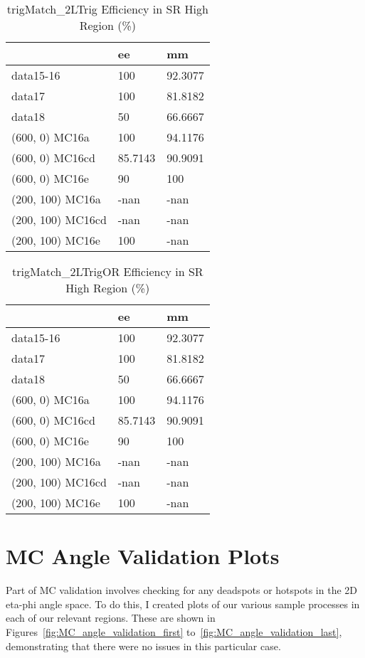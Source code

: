 \begin{table}
\begin{center}
\caption{trigMatch\_2LTrig Efficiency in SR High Region (\%)}
\begin{tabular}{l|l|l}
& ee & mm \\
\hline
data15-16 & 100 & 92.3077 \\
data17 & 100 & 81.8182 \\
data18 & 50 & 66.6667 \\
(600, 0) MC16a & 100 & 94.1176 \\
(600, 0) MC16cd & 85.7143 & 90.9091 \\
(600, 0) MC16e & 90 & 100 \\
(200, 100) MC16a & -nan & -nan \\
(200, 100) MC16cd & -nan & -nan \\
(200, 100) MC16e & 100 & -nan \\
\end{tabular}
\end{center}
\end{table}

\begin{table}
\begin{center}
\caption{trigMatch\_2LTrigOR Efficiency in SR High Region (\%)}
\begin{tabular}{l|l|l}
& ee & mm \\
\hline
data15-16 & 100 & 92.3077 \\
data17 & 100 & 81.8182 \\
data18 & 50 & 66.6667 \\
(600, 0) MC16a & 100 & 94.1176 \\
(600, 0) MC16cd & 85.7143 & 90.9091 \\
(600, 0) MC16e & 90 & 100 \\
(200, 100) MC16a & -nan & -nan \\
(200, 100) MC16cd & -nan & -nan \\
(200, 100) MC16e & 100 & -nan
\label{tab:trigger_last}
\end{tabular}
\end{center}
\end{table}

\section{MC Angle Validation Plots}

Part of MC validation involves checking for any deadspots or hotspots in the 2D eta-phi angle space. To do this, I created plots of our various sample processes in each of our relevant regions. These are shown in Figures~\ref{fig:MC_angle_validation_first} to~\ref{fig:MC_angle_validation_last}, demonstrating that there were no issues in this particular case.

